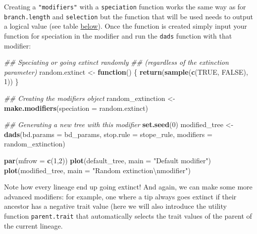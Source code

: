 \documentclass[]{book}
\newenvironment{Shaded}{\begin{snugshade}}{\end{snugshade}}
\newcommand{\CharTok}[1]{\textcolor[rgb]{0.31,0.60,0.02}{#1}}
\newcommand{\CommentTok}[1]{\textcolor[rgb]{0.56,0.35,0.01}{\textit{#1}}}
\newcommand{\ControlFlowTok}[1]{\textcolor[rgb]{0.13,0.29,0.53}{\textbf{#1}}}
\newcommand{\DataTypeTok}[1]{\textcolor[rgb]{0.13,0.29,0.53}{#1}}
\newcommand{\DecValTok}[1]{\textcolor[rgb]{0.00,0.00,0.81}{#1}}
\newcommand{\KeywordTok}[1]{\textcolor[rgb]{0.13,0.29,0.53}{\textbf{#1}}}
\newcommand{\NormalTok}[1]{#1}
\newcommand{\OtherTok}[1]{\textcolor[rgb]{0.56,0.35,0.01}{#1}}
\newcommand{\StringTok}[1]{\textcolor[rgb]{0.31,0.60,0.02}{#1}}
\begin{document}
Creating a \texttt{"modifiers"} with a \texttt{speciation} function works the same way as for \texttt{branch.length} and \texttt{selection} but the function that will be used needs to output a logical value (see table \protect\hyperlink{summarymodifiers}{below}).
Once the function is created simply input your function for speciation in the modifier and run the \texttt{dads} function with that modifier:

\begin{Shaded}
\begin{Highlighting}[]
\CommentTok{## Speciating or going extinct randomly}
\CommentTok{## (regardless of the extinction parameter)}
\NormalTok{random.extinct  <-}\StringTok{ }\ControlFlowTok{function}\NormalTok{() \{}
    \KeywordTok{return}\NormalTok{(}\KeywordTok{sample}\NormalTok{(}\KeywordTok{c}\NormalTok{(}\OtherTok{TRUE}\NormalTok{, }\OtherTok{FALSE}\NormalTok{), }\DecValTok{1}\NormalTok{))}
\NormalTok{\}}

\CommentTok{## Creating the modifiers object}
\NormalTok{random_extinction <-}\StringTok{ }\KeywordTok{make.modifiers}\NormalTok{(}\DataTypeTok{speciation =}\NormalTok{ random.extinct)}

\CommentTok{## Generating a new tree with this modifier}
\KeywordTok{set.seed}\NormalTok{(}\DecValTok{0}\NormalTok{)}
\NormalTok{modified_tree <-}\StringTok{ }\KeywordTok{dads}\NormalTok{(}\DataTypeTok{bd.params =}\NormalTok{ bd_params,}
                      \DataTypeTok{stop.rule =}\NormalTok{ stope_rule,}
                      \DataTypeTok{modifiers =}\NormalTok{ random_extinction)}

\KeywordTok{par}\NormalTok{(}\DataTypeTok{mfrow =} \KeywordTok{c}\NormalTok{(}\DecValTok{1}\NormalTok{,}\DecValTok{2}\NormalTok{))}
\KeywordTok{plot}\NormalTok{(default_tree,  }\DataTypeTok{main =} \StringTok{"Default modifier"}\NormalTok{)}
\KeywordTok{plot}\NormalTok{(modified_tree, }\DataTypeTok{main =} \StringTok{"Random extinction}\CharTok{\textbackslash{}n}\StringTok{modifier"}\NormalTok{)}
\end{Highlighting}
\end{Shaded}

Note how every lineage end up going extinct!
And again, we can make some more advanced modifiers: for example, one where a tip always goes extinct if their ancestor has a negative trait value (here we will also introduce the utility function \texttt{parent.trait} that automatically selects the trait values of the parent of the current lineage.
\end{document}
